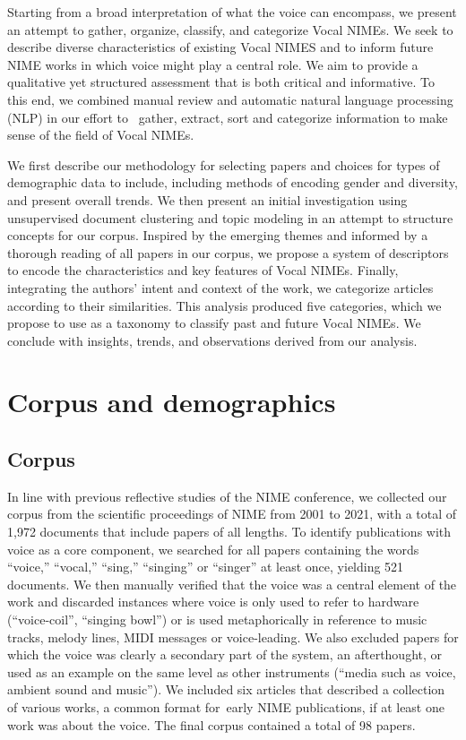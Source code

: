 \documentclass[sigconf]{nimeart}
\begin{document}
Starting from a broad interpretation of what the voice can encompass, we present an attempt to gather, organize, classify, and categorize Vocal NIMEs. We seek to describe diverse characteristics of existing Vocal NIMES and to inform future NIME works in which voice might play a central role. We aim to provide a qualitative yet structured assessment that is both critical and informative. To this end, we combined manual review and automatic natural language processing (NLP) in our effort to~ gather, extract, sort and categorize information to make sense of the field of Vocal NIMEs.

We first describe our methodology for selecting papers and choices for types of demographic data to include, including methods of encoding gender and diversity, and present overall trends. We then present an initial investigation using unsupervised document clustering and topic modeling in an attempt to structure concepts for our corpus. Inspired by the emerging themes and informed by a thorough reading of all papers in our corpus, we propose a system of descriptors to encode the characteristics and key features of Vocal NIMEs. Finally, integrating the authors' intent and context of the work, we categorize articles according to their similarities. This analysis produced five categories, which we propose to use as a taxonomy to classify past and future Vocal NIMEs. We conclude with insights, trends, and observations derived from our analysis.


\section{\texorpdfstring{\textbf{Corpus and demographics}}{Corpus and demographics}}\label{corpus-and-demographics}

\subsection{Corpus}\label{corpus}

In line with previous reflective studies of the NIME conference, we collected our corpus from the scientific proceedings of NIME from 2001 to 2021, with a total of 1,972 documents that include papers of all lengths. To identify publications with voice as a core component, we searched for all papers containing the words ``voice,'' ``vocal,'' ``sing,'' ``singing'' or ``singer'' at least once, yielding 521 documents. We then manually verified that the voice was a central element of the work and discarded instances where voice is only used to refer to hardware (``voice-coil'', ``singing bowl'') or is used metaphorically in reference to music tracks, melody lines, MIDI messages or voice-leading. We also excluded papers for which the voice was clearly a secondary part of the system, an afterthought, or used as an example on the same level as other instruments (``media such as voice, ambient sound and music''). We included six articles that described a collection of various works, a common format for~early NIME publications, if at least one work was about the voice. The final corpus contained a total of 98 papers.
\end{document}
